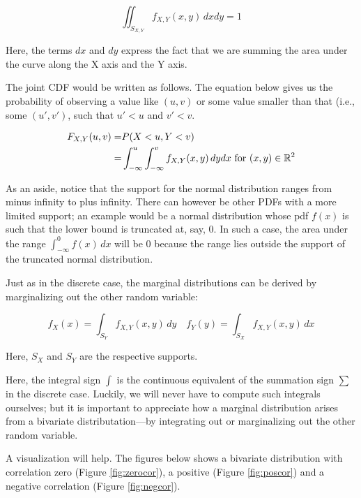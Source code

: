 \documentclass[12pt,]{krantz}
\theoremstyle{definition}
\theoremstyle{definition}
\theoremstyle{definition}
\theoremstyle{remark}
\begin{document}
\begin{equation}
\iint_{S_{X,Y}} f_{X,Y}(x,y)\, dx dy = 1
\end{equation}

Here, the terms \(dx\) and \(dy\) express the fact that we are summing
the area under the curve along the X axis and the Y axis.

The joint CDF would be written as follows. The equation below gives us
the probability of observing a value like \((u,v)\) or some value
smaller than that (i.e., some \((u',v')\), such that \(u'<u\) and
\(v'<v\).

\begin{equation}
\begin{split}
F_{X,Y}(u,v) =& P(X<u,Y<v)\\
             =& \int_{-\infty}^u \int_{-\infty}^v f_{X,Y}(x,y)\, dy dx \hbox{ for } (x,y)\in \mathbb{R}^2\\
\end{split}
\end{equation}

As an aside, notice that the support for the normal distribution ranges
from minus infinity to plus infinity. There can however be other PDFs
with a more limited support; an example would be a normal distribution
whose pdf \(f(x)\) is such that the lower bound is truncated at, say, 0.
In such a case, the area under the range \(\int_{-\infty}^0 f(x) \, dx\)
will be 0 because the range lies outside the support of the truncated
normal distribution.

Just as in the discrete case, the marginal distributions can be derived
by marginalizing out the other random variable:

\begin{equation}
f_X(x) = \int_{S_Y} f_{X,Y}(x,y)\, dy \quad f_Y(y) = \int_{S_X} f_{X,Y}(x,y)\, dx
\end{equation}

Here, \(S_X\) and \(S_Y\) are the respective supports.

Here, the integral sign \(\int\) is the continuous equivalent of the
summation sign \(\sum\) in the discrete case. Luckily, we will never
have to compute such integrals ourselves; but it is important to
appreciate how a marginal distribution arises from a bivariate
distributation---by integrating out or marginalizing out the other
random variable.

A visualization will help. The figures below shows a bivariate
distribution with correlation zero (Figure \ref{fig:zerocor}), a
positive (Figure \ref{fig:poscor}) and a negative correlation (Figure
\ref{fig:negcor}).
\end{document}
